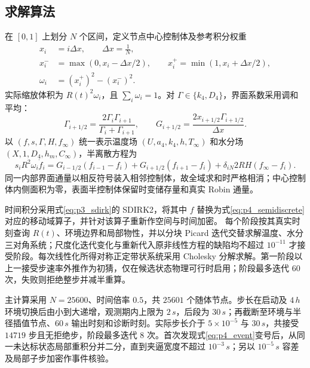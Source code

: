 \documentclass[withoutpreface,bwprint]{cumcmthesis}
\begin{document}
\subsection{求解算法}

在 $[0,1]$ 上划分 $N$ 个区间，定义节点中心控制体及参考积分权重
\begin{equation}
\begin{aligned}
x_i&=i\Delta x,\qquad \Delta x=\frac1N,\\
x_i^-&=\max(0,x_i-\Delta x/2),\qquad
x_i^+=\min(1,x_i+\Delta x/2),\\
\omega_i&=(x_i^+)^2-(x_i^-)^2.
\end{aligned}
\label{eq:p4_grid}
\end{equation}
实际缩放体积为 $R(t)^2\omega_i$，且 $\sum_i\omega_i=1$。对 $\Gamma\in\{k_4,D_4\}$，界面系数采用调和平均：
\begin{equation}
\Gamma_{i+1/2}=\frac{2\Gamma_i\Gamma_{i+1}}{\Gamma_i+\Gamma_{i+1}},\qquad
G_{i+1/2}=\frac{2x_{i+1/2}\Gamma_{i+1/2}}{\Delta x}.
\label{eq:p4_conductance}
\end{equation}
以 $(f,s,\Gamma,H,f_\infty)$ 统一表示温度场 $(U,a_4,k_4,h,T_\infty)$ 和水分场 $(X,1,D_4,h_m,C_\infty)$，半离散方程为
\begin{equation}
s_iR^2\omega_i\dot f_i
=G_{i-1/2}(f_{i-1}-f_i)+G_{i+1/2}(f_{i+1}-f_i)
+\delta_{iN}2RH(f_\infty-f_i).
\label{eq:p4_semidiscrete}
\end{equation}
同一内部界面通量以相反符号装入相邻控制体，故全域求和时严格相消；中心控制体内侧面积为零，表面半控制体保留时变储存量和真实 Robin 通量。

时间积分采用式\eqref{eq:p3_sdirk}的 SDIRK2，将其中 $f$ 替换为式\eqref{eq:p4_semidiscrete}对应的移动域算子，并针对该算子重新作空间与时间加密。
每个阶段按其真实时刻查询 $R(t)$、环境边界和局部物性，并以分块 Picard 迭代交替求解温度、水分三对角系统；尺度化迭代变化与重新代入原非线性方程的缺陷均不超过 $10^{-11}$ 才接受阶段。每次线性化所得对称正定带状系统采用 Cholesky 分解求解。第一阶段以上一接受步速率外推作为初猜，仅在候选状态物理可行时启用；阶段最多迭代 $60$ 次，失败则拒绝整步并减半重算。

主计算采用 $N=25600$、时间倍率 $0.5$，共 $25601$ 个随体节点。步长在启动及 $4\,\si{h}$ 环境切换后由小到大递增，观测期内上限为 $2\,\si{s}$，后段为 $30\,\si{s}$；再截断至环境与半径插值节点、$60\,\si{s}$ 输出时刻和诊断时刻。实际步长介于 $5\times10^{-5}$ 与 $30\,\si{s}$，共接受 $14719$ 步且无拒绝步，阶段最多迭代 $8$ 次。首次发现式\eqref{eq:p4_event}变号后，从同一未达标状态局部重积分并二分，直到夹逼宽度不超过 $10^{-3}\,\si{s}$；另以 $10^{-5}\,\si{s}$ 容差及局部子步加密作事件核验。
\end{document}
